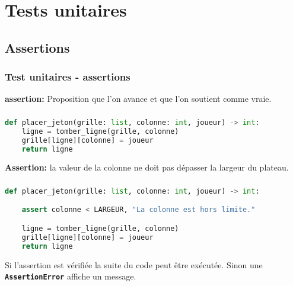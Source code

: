\documentclass[svgnames,11pt]{beamer}
\begin{document}
\section{Tests unitaires}
\subsection{Assertions}
\begin{frame}
    \frametitle{Test unitaires - assertions}

    \begin{aretenir}[Définition]
        \textbf{assertion:} Proposition que l'on avance et que l'on soutient comme vraie.
    \end{aretenir}

\end{frame}
\begin{frame}[fragile]
    \frametitle{}

    \begin{center}
        \begin{lstlisting}[language=Python , basicstyle=\ttfamily\small, xleftmargin=.2em, xrightmargin=-4em]
def placer_jeton(grille: list, colonne: int, joueur) -> int:
    ligne = tomber_ligne(grille, colonne)
    grille[ligne][colonne] = joueur
    return ligne
\end{lstlisting}
        \label{CODE}
    \end{center}
    \textbf{Assertion:} la valeur de la colonne ne doit pas dépasser la largeur du plateau.
\end{frame}
\begin{frame}[fragile]
    \frametitle{}

    \begin{center}
        \begin{lstlisting}[language=Python , basicstyle=\ttfamily\small, xleftmargin=.2em, xrightmargin=-4em]
def placer_jeton(grille: list, colonne: int, joueur) -> int:

    assert colonne < LARGEUR, "La colonne est hors limite."

    ligne = tomber_ligne(grille, colonne)
    grille[ligne][colonne] = joueur
    return ligne
\end{lstlisting}
        \label{CODE}
    \end{center}
    \begin{aretenir}[]
        Si l'assertion est vérifiée la suite du code peut être exécutée. Sinon une \textbf{\texttt{AssertionError}} affiche un message.
    \end{aretenir}
\end{frame}
\end{document}
